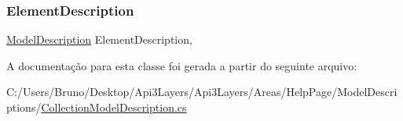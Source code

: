 \subsubsection{\texorpdfstring{Element\+Description}{ElementDescription}}
{\footnotesize\ttfamily \hyperlink{classApi3Layers_1_1Areas_1_1HelpPage_1_1ModelDescriptions_1_1ModelDescription}{Model\+Description} Element\+Description\hspace{0.3cm}{\ttfamily [get]}, {\ttfamily [set]}}



A documentação para esta classe foi gerada a partir do seguinte arquivo\+:\begin{DoxyCompactItemize}
\item 
C\+:/\+Users/\+Bruno/\+Desktop/\+Api3\+Layers/\+Api3\+Layers/\+Areas/\+Help\+Page/\+Model\+Descriptions/\hyperlink{CollectionModelDescription_8cs}{Collection\+Model\+Description.\+cs}\end{DoxyCompactItemize}
